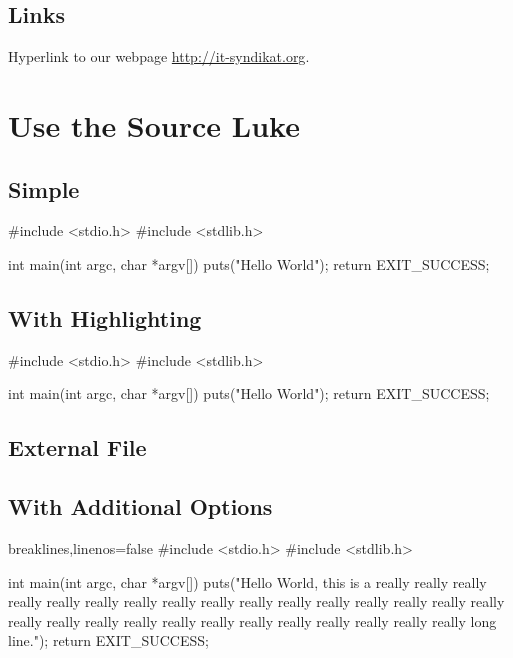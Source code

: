 \documentclass{uibk}
\begin{document}
\subsection{Links}
\label{sub:links}

Hyperlink to our webpage \url{http://it-syndikat.org}.

\newpage

\section{Use the Source Luke}
\label{sec:use_the_source_luke}

\subsection{Simple}
\label{sub:simple}

\begin{code}
    #include <stdio.h>
    #include <stdlib.h>

    int main(int argc, char *argv[]) {
        puts("Hello World");
        return EXIT_SUCCESS;
    }
\end{code}

\subsection{With Highlighting}
\label{sub:with_highlighting}

\begin{ccode}
    #include <stdio.h>
    #include <stdlib.h>

    int main(int argc, char *argv[]) {
        puts("Hello World");
        return EXIT_SUCCESS;
    }
\end{ccode}

\subsection{External File}
\label{sub:external_file}


\subsection{With Additional Options}
\label{sub:with_additional_options}

\begin{ccode*}{breaklines,linenos=false}
    #include <stdio.h>
    #include <stdlib.h>

    int main(int argc, char *argv[]) {
        puts("Hello World, this is a really really really really really really really really really really really really really really really really really really really really really really really really really really really really long line.");
        return EXIT_SUCCESS;
    }
\end{ccode*}
\end{document}
